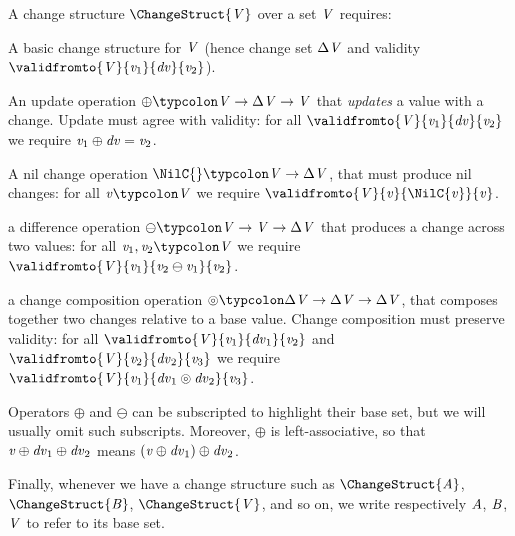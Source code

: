 \begin{definition}
  \label{def:change-structure}
  A change structure \ensuremath{\ChangeStruct{\Conid{V}}} over a set \ensuremath{\Conid{V}} requires:
  \begin{subdefinition}
  \item A basic change structure for \ensuremath{\Conid{V}} (hence change set \ensuremath{\Delta \Conid{V}}
    and validity \ensuremath{\validfromto{\Conid{V}}{\Varid{v}_{1}}{\Varid{dv}}{\Varid{v}_{2}}}).
  \item An update operation \ensuremath{\oplus \typcolon\Conid{V}\to \Delta \Conid{V}\to \Conid{V}} that
    \emph{updates} a value with a change. Update must agree with
    validity: for all \ensuremath{\validfromto{\Conid{V}}{\Varid{v}_{1}}{\Varid{dv}}{\Varid{v}_{2}}} we require \ensuremath{\Varid{v}_{1}\oplus \Varid{dv}\mathrel{=}\Varid{v}_{2}}.
  \item A nil change operation \ensuremath{\NilC{}\typcolon\Conid{V}\to \Delta \Conid{V}}, that must
    produce nil changes: for all \ensuremath{\Varid{v}\typcolon\Conid{V}} we require \ensuremath{\validfromto{\Conid{V}}{\Varid{v}}{\NilC{\Varid{v}}}{\Varid{v}}}.
  \item a difference operation \ensuremath{\ominus \typcolon\Conid{V}\to \Conid{V}\to \Delta \Conid{V}} that
    produces a change across two values: for all \ensuremath{\Varid{v}_{1},\Varid{v}_{2}\typcolon\Conid{V}} we require
    \ensuremath{\validfromto{\Conid{V}}{\Varid{v}_{1}}{\Varid{v}_{2}\ominus \Varid{v}_{1}}{\Varid{v}_{2}}}.
  \item a change composition operation
    \ensuremath{\circledcirc \typcolon\Delta \Conid{V}\to \Delta \Conid{V}\to \Delta \Conid{V}},
    that composes together two changes relative to a base value.
    Change composition must preserve validity:
    for all \ensuremath{\validfromto{\Conid{V}}{\Varid{v}_{1}}{\Varid{dv}_{1}}{\Varid{v}_{2}}} and \ensuremath{\validfromto{\Conid{V}}{\Varid{v}_{2}}{\Varid{dv}_{2}}{\Varid{v}_{3}}}
    we require \ensuremath{\validfromto{\Conid{V}}{\Varid{v}_{1}}{\Varid{dv}_{1}\circledcirc\Varid{dv}_{2}}{\Varid{v}_{3}}}.
  \end{subdefinition}
\end{definition}

\begin{notation}
Operators \ensuremath{\oplus } and \ensuremath{\ominus } can be subscripted to
highlight their base set, but we will usually omit such
subscripts. Moreover, \ensuremath{\oplus } is left-associative, so that
\ensuremath{\Varid{v}\oplus \Varid{dv}_{1}\oplus \Varid{dv}_{2}} means \ensuremath{(\Varid{v}\oplus \Varid{dv}_{1})\oplus \Varid{dv}_{2}}.

Finally, whenever we have a change structure such as
\ensuremath{\ChangeStruct{\Conid{A}}}, \ensuremath{\ChangeStruct{\Conid{B}}}, \ensuremath{\ChangeStruct{\Conid{V}}}, and so on, we write respectively
\ensuremath{\Conid{A}}, \ensuremath{\Conid{B}}, \ensuremath{\Conid{V}} to refer to its base set.
\end{notation}

